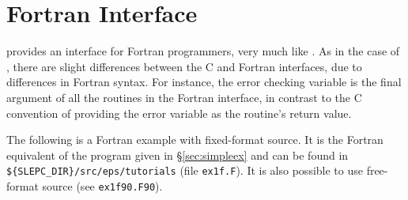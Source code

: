 \section{Fortran Interface}
\label{sec:fortran}

	\slepc provides an interface for Fortran programmers, very much like \petsc. As in the case of \petsc, there are slight differences between the C and Fortran \slepc interfaces, due to differences in Fortran syntax. For instance, the error checking variable is the final argument of all the routines in the Fortran interface, in contrast to the C convention of providing the error variable as the routine's return value.

	The following is a Fortran example with fixed-format source. It is the Fortran equivalent of the program given in \S\ref{sec:simpleex} and can be found in \Verb!${SLEPC_DIR}/src/eps/tutorials! (file \texttt{ex1f.F}). It is also possible to use free-format source (see \texttt{ex1f90.F90}).

%
%
%

